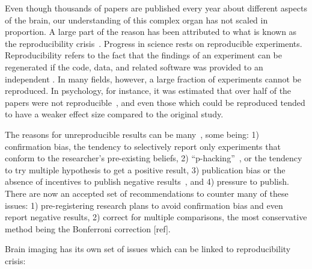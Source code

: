Even though thousands of papers are published every year about different aspects of the brain, our understanding of this complex organ has not scaled in proportion. A large part of the reason has been attributed to what is known as the reproducibility crisis~\citep{ioannidis2005most, simmons2011false, button2013power}. %
Progress in science rests on reproducible experiments. Reproducibility refers to the fact that the findings of an experiment can be regenerated if the code, data, and related software was provided to an independent . In many fields, however, a large fraction of experiments cannot be reproduced. In psychology, for instance, it was estimated that over half of the papers were not reproducible~\citep{open2015estimating}, and even those which could be reproduced tended to have a weaker effect size compared to the original study. 

The reasons for unreproducible results can be many~\citep{baker20161}, some being: 1) confirmation bias, the tendency to selectively report only experiments that conform to the researcher's pre-existing beliefs, 2) ``p-hacking''~\citep{simmons2011false}, or the tendency to try multiple hypothesis to get a positive result, 3) publication bias or the absence of incentives to publish negative results~\citep{rosenthal1979file}, and 4) pressure to publish. There are now an accepted set of recommendations to counter many of these issues: 1) pre-registering research plans to avoid confirmation bias and even report negative results, 2) correct for multiple comparisons, the most conservative method being the Bonferroni correction [ref]. 

Brain imaging has its own set of issues which can be linked to reproducibility crisis: 


